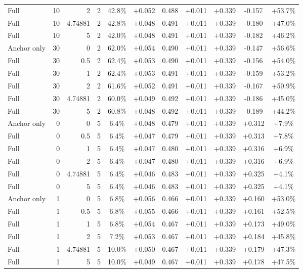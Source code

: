 \begin{table}[htbp]
\begin{tabular}{lrrrccccccc}
Full & 10 & 2 & 2 & 42.8\% & +0.052 & 0.488 & +0.011 & +0.339 & -0.157 & +53.7\% \\
Full & 10 & 4.74881 & 2 & 42.8\% & +0.048 & 0.491 & +0.011 & +0.339 & -0.180 & +47.0\% \\
Full & 10 & 5 & 2 & 42.0\% & +0.048 & 0.491 & +0.011 & +0.339 & -0.182 & +46.2\% \\
Anchor only & 30 & 0 & 2 & 62.0\% & +0.054 & 0.490 & +0.011 & +0.339 & -0.147 & +56.6\% \\
Full & 30 & 0.5 & 2 & 62.4\% & +0.053 & 0.490 & +0.011 & +0.339 & -0.156 & +54.0\% \\
Full & 30 & 1 & 2 & 62.4\% & +0.053 & 0.491 & +0.011 & +0.339 & -0.159 & +53.2\% \\
Full & 30 & 2 & 2 & 61.6\% & +0.052 & 0.491 & +0.011 & +0.339 & -0.167 & +50.9\% \\
Full & 30 & 4.74881 & 2 & 60.0\% & +0.049 & 0.492 & +0.011 & +0.339 & -0.186 & +45.0\% \\
Full & 30 & 5 & 2 & 60.8\% & +0.048 & 0.492 & +0.011 & +0.339 & -0.189 & +44.2\% \\
Anchor only & 0 & 0 & 5 & 6.4\% & +0.048 & 0.479 & +0.011 & +0.339 & +0.312 & +7.9\% \\
Full & 0 & 0.5 & 5 & 6.4\% & +0.047 & 0.479 & +0.011 & +0.339 & +0.313 & +7.8\% \\
Full & 0 & 1 & 5 & 6.4\% & +0.047 & 0.480 & +0.011 & +0.339 & +0.316 & +6.9\% \\
Full & 0 & 2 & 5 & 6.4\% & +0.047 & 0.480 & +0.011 & +0.339 & +0.316 & +6.9\% \\
Full & 0 & 4.74881 & 5 & 6.4\% & +0.046 & 0.483 & +0.011 & +0.339 & +0.325 & +4.1\% \\
Full & 0 & 5 & 5 & 6.4\% & +0.046 & 0.483 & +0.011 & +0.339 & +0.325 & +4.1\% \\
Anchor only & 1 & 0 & 5 & 6.8\% & +0.056 & 0.466 & +0.011 & +0.339 & +0.160 & +53.0\% \\
Full & 1 & 0.5 & 5 & 6.8\% & +0.055 & 0.466 & +0.011 & +0.339 & +0.161 & +52.5\% \\
Full & 1 & 1 & 5 & 6.8\% & +0.054 & 0.467 & +0.011 & +0.339 & +0.173 & +49.0\% \\
Full & 1 & 2 & 5 & 7.2\% & +0.053 & 0.467 & +0.011 & +0.339 & +0.184 & +45.8\% \\
Full & 1 & 4.74881 & 5 & 10.0\% & +0.050 & 0.467 & +0.011 & +0.339 & +0.179 & +47.3\% \\
Full & 1 & 5 & 5 & 10.0\% & +0.049 & 0.467 & +0.011 & +0.339 & +0.178 & +47.5\% \\

\end{tabular}
\end{table}
